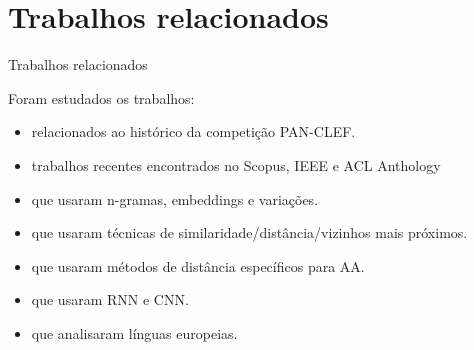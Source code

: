 \section{Trabalhos relacionados}

\begin{frame}{Trabalhos relacionados}

Foram estudados os trabalhos:
\begin{itemize}
	\item relacionados ao histórico da competição PAN-CLEF.
	\item trabalhos recentes encontrados no Scopus, IEEE e ACL Anthology
	\item que usaram n-gramas, embeddings e variações.
	\item que usaram técnicas de similaridade/distância/vizinhos mais próximos.
	\item que usaram métodos de distância específicos para AA.
	\item que usaram RNN e CNN.
	\item que analisaram línguas europeias.
\end{itemize}

\end{frame}


